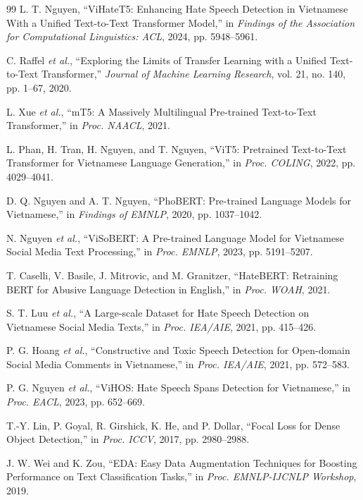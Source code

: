 \documentclass[journal]{IEEEtran}
\begin{document}
\begin{thebibliography}{99}
L. T. Nguyen, ``ViHateT5: Enhancing Hate Speech Detection in Vietnamese With a Unified Text-to-Text Transformer Model,'' in \emph{Findings of the Association for Computational Linguistics: ACL}, 2024, pp. 5948--5961.

C. Raffel \emph{et al.}, ``Exploring the Limits of Transfer Learning with a Unified Text-to-Text Transformer,'' \emph{Journal of Machine Learning Research}, vol. 21, no. 140, pp. 1--67, 2020.

L. Xue \emph{et al.}, ``mT5: A Massively Multilingual Pre-trained Text-to-Text Transformer,'' in \emph{Proc. NAACL}, 2021.

L. Phan, H. Tran, H. Nguyen, and T. Nguyen, ``ViT5: Pretrained Text-to-Text Transformer for Vietnamese Language Generation,'' in \emph{Proc. COLING}, 2022, pp. 4029--4041.

D. Q. Nguyen and A. T. Nguyen, ``PhoBERT: Pre-trained Language Models for Vietnamese,'' in \emph{Findings of EMNLP}, 2020, pp. 1037--1042.

N. Nguyen \emph{et al.}, ``ViSoBERT: A Pre-trained Language Model for Vietnamese Social Media Text Processing,'' in \emph{Proc. EMNLP}, 2023, pp. 5191--5207.

T. Caselli, V. Basile, J. Mitrovic, and M. Granitzer, ``HateBERT: Retraining BERT for Abusive Language Detection in English,'' in \emph{Proc. WOAH}, 2021.

S. T. Luu \emph{et al.}, ``A Large-scale Dataset for Hate Speech Detection on Vietnamese Social Media Texts,'' in \emph{Proc. IEA/AIE}, 2021, pp. 415--426.

P. G. Hoang \emph{et al.}, ``Constructive and Toxic Speech Detection for Open-domain Social Media Comments in Vietnamese,'' in \emph{Proc. IEA/AIE}, 2021, pp. 572--583.

P. G. Nguyen \emph{et al.}, ``ViHOS: Hate Speech Spans Detection for Vietnamese,'' in \emph{Proc. EACL}, 2023, pp. 652--669.

T.-Y. Lin, P. Goyal, R. Girshick, K. He, and P. Dollar, ``Focal Loss for Dense Object Detection,'' in \emph{Proc. ICCV}, 2017, pp. 2980--2988.

J. W. Wei and K. Zou, ``EDA: Easy Data Augmentation Techniques for Boosting Performance on Text Classification Tasks,'' in \emph{Proc. EMNLP-IJCNLP Workshop}, 2019.
\end{thebibliography}
\end{document}

